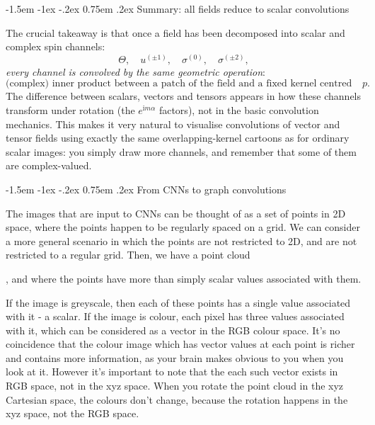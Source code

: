 \documentclass[12pt]{article}
\makeatletter
\renewcommand\subsection{\@startsection{subsection}{2}{\z@}%
                                     {-1.5em \@plus -1ex \@minus -.2ex}%
                                     {0.75em \@plus .2ex}%
                                     {\normalfont\large\bfseries}}
\makeatother
\begin{document}
\subsection{Summary: all fields reduce to scalar convolutions}

The crucial takeaway is that once a field has been decomposed into
scalar and complex spin channels:
\[
  \Theta,\quad
  u^{(\pm1)},\quad
  \sigma^{(0)},\quad
  \sigma^{(\pm2)},
\]
\emph{every channel is convolved by the same geometric operation}:
\[
  \text{(complex) inner product between a patch of the field and a
        fixed kernel centred at }p.
\]
The difference between scalars, vectors and tensors appears in how
these channels transform under rotation (the $e^{\mathrm{i}m\alpha}$
factors), not in the basic convolution mechanics. This makes it very
natural to visualise convolutions of vector and tensor fields using
exactly the same overlapping-kernel cartoons as for ordinary scalar
images: you simply draw more channels, and remember that some of them
are complex-valued.










\subsection{From CNNs to graph convolutions}

The images that are input to CNNs can be thought of as a set of points in 2D space, where the points happen to be regularly spaced on a grid. We can consider a more general scenario in which the points are not restricted to 2D, and are not restricted to a regular grid. Then, we have a point cloud

, and where the points have more than simply scalar values associated with them.


If the image is greyscale, then each of these points has a single value associated with it - a scalar. If the image is colour, each pixel has three values associated with it, which can be considered as a vector in the RGB colour space. It's no coincidence that the colour image which has vector values at each point is richer and contains more information, as your brain makes obvious to you when you look at it. However it's important to note that the each such vector exists in RGB space, not in the xyz space. When you rotate the point cloud in the xyz Cartesian space, the colours don't change, because the rotation happens in the xyz space, not the RGB space.
\end{document}
